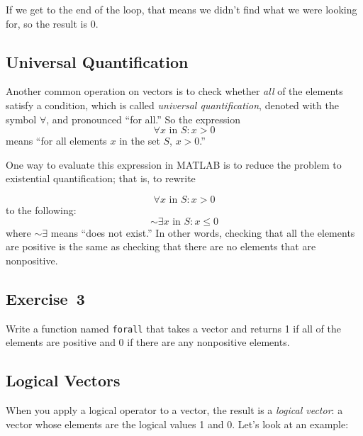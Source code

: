 
If we get to the end of the loop, that means we didn't find what
we were looking for, so the result is 0.

\subsection{Universal Quantification}


Another common operation on vectors is to check whether \emph{all}
of the elements satisfy a condition, which is called \emph{universal quantification}, denoted with
the symbol $\forall$, and pronounced ``for all.''  So the expression %
%
\[ \forall x \mbox{~in~} S: x>0 \]
%
means ``for all elements $x$ in the set $S$, $x>0$.''

One way to evaluate this expression in MATLAB is to reduce the problem to
existential quantification; that is, to rewrite

\begin{equation*}
\forall x \mbox{~in~} S: x>0
\end{equation*}
to the following:
\begin{equation*}
{\sim} \exists x \mbox{~in~} S: x \le 0
\end{equation*}
where ${\sim} \exists$ means ``does not exist.''
In other words, checking that all the elements are positive is
the same as checking that there are no elements
that are nonpositive.

\subsection{Exercise~3}
Write a function named \lstinline{forall} that
takes a vector and returns 1 if all of the elements are positive
and 0 if there are any nonpositive elements.





\subsection{Logical Vectors}

When you apply a logical operator to a vector, the result is a 
\emph{logical vector}: a vector whose elements are the logical
values 1 and 0. Let's look at an example:

